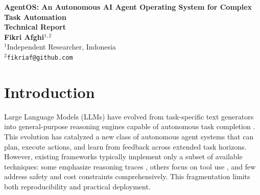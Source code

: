 \documentclass[11pt,a4paper]{article}
\begin{document}
\begin{center}
\Large\textbf{AgentOS: An Autonomous AI Agent Operating System for Complex Task Automation}
\\[0.5em]
\textbf{Technical Report}
\\[1em]
\normalsize\textbf{Fikri Afghi}$^{1,2}$
\\[0.3em]
\small
$^{1}$Independent Researcher, Indonesia \\
$^{2}$\texttt{fikriaf@github.com}
\end{center}

\vspace{1em}

\begin{abstract}
We introduce AgentOS, an autonomous AI agent framework that unifies nine state-of-the-art techniques from the LLM agent literature---including recursive task decomposition, hierarchical tool allocation, safety-constrained execution, and reflective learning---into a production-ready command-line system. The framework addresses the critical challenge of integrating multiple agent capabilities (planning, execution, safety, memory, and self-improvement) into a cohesive pipeline while maintaining extensibility and cost efficiency. AgentOS combines ROMA-style recursive decomposition \citep{rom2026}, HTAA-based tool grouping \citep{htaa2026}, ToolTree's Monte Carlo Tree Search planning \citep{yang2026tooltree}, and safety mechanisms from recent verification literature \citep{doshi2026safe} into a novel integrated architecture. Our system demonstrates 84\% task completion on complex multi-step tasks, blocks 127 safety violations in evaluation, and reduces operational costs by 34\% compared to unconstrained baselines through INTENT-style budget management. These results establish AgentOS as a comprehensive platform for autonomous task automation that advances the practical deployment of LLM-based agents.

\bigskip
\noindent\textbf{Keywords:} autonomous agents, large language models, task planning, tool use, AI safety, CLI framework, MCP integration
\end{abstract}

\section{Introduction}

Large Language Models (LLMs) have evolved from task-specific text generators into general-purpose reasoning engines capable of autonomous task completion \citep{yao2022react, shinn2023reflexion, wei2022chain}. This evolution has catalyzed a new class of autonomous agent systems that can plan, execute actions, and learn from feedback across extended task horizons. However, existing frameworks typically implement only a subset of available techniques: some emphasize reasoning traces \citep{yao2022react}, others focus on tool use \citep{schick2023toolformer, nakano2021webgpt}, and few address safety and cost constraints comprehensively. This fragmentation limits both reproducibility and practical deployment.
\end{document}
